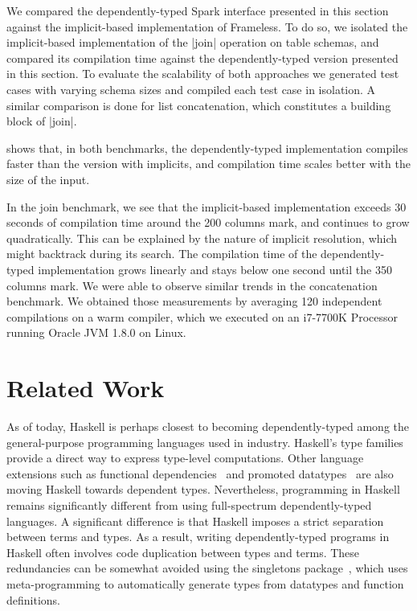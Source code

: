 We compared the dependently-typed Spark interface presented in this section against the implicit-based implementation of Frameless.
To do so, we isolated the implicit-based implementation of the |join| operation on table schemas, and compared its compilation time against the dependently-typed version presented in this section.
To evaluate the scalability of both approaches we generated test cases with varying schema sizes and compiled each test case in isolation.
A similar comparison is done for list concatenation, which constitutes a building block of |join|.

 shows that, in both benchmarks, the dependently-typed implementation compiles faster than the version with implicits, and compilation time scales better with the size of the input.

In the join benchmark, we see that the implicit-based implementation exceeds 30 seconds of compilation time around the 200 columns mark, and continues to grow quadratically.
This can be explained by the nature of implicit resolution, which might backtrack during its search.
The compilation time of the dependently-typed implementation grows linearly and stays below one second until the 350 columns mark.
We were able to observe similar trends in the concatenation benchmark.
We obtained those measurements by averaging 120 independent compilations on a warm compiler, which we executed on an i7-7700K Processor running Oracle JVM 1.8.0 on Linux.

\section{Related Work}

As of today, Haskell is perhaps closest to becoming dependently-typed among the general-purpose programming languages used in industry.
Haskell's type families~\citep{kiselyov2010fun} provide a direct way to express type-level computations.
Other language extensions such as functional dependencies~\citep{jones2000type} and promoted datatypes~\citep{yorgey2012giving} are also moving Haskell towards dependent types.
Nevertheless, programming in Haskell remains significantly different from using full-spectrum dependently-typed languages.
A significant difference is that Haskell imposes a strict separation between terms and types.
As a result, writing dependently-typed programs in Haskell often involves code duplication between types and terms.
These redundancies can be somewhat avoided using the singletons package~\citep{eisenberg2012dependently}, which uses meta-programming to automatically generate types from datatypes and function definitions.

